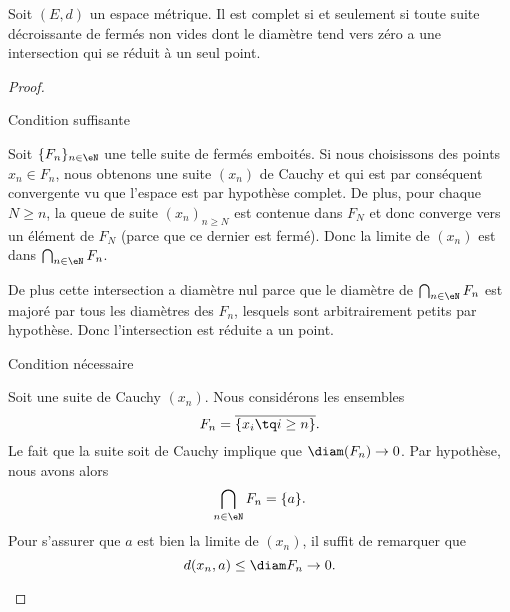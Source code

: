 \begin{theorem}   \label{ThoCQAcZxX}
    Soit \( (E,d)\) un espace métrique. Il est complet si et seulement si toute suite décroissante de fermés non vides dont le diamètre tend vers zéro a une intersection qui se réduit à un seul point.
\end{theorem}

\begin{proof}
    \begin{subproof}
    \item[Condition suffisante]

        Soit \( \{ F_n \}_{n\in \eN}\) une telle suite de fermés emboités. Si nous choisissons des points \( x_n\in F_n\), nous obtenons une suite \( (x_n)\) de Cauchy et qui est par conséquent convergente vu que l'espace est par hypothèse complet. De plus, pour chaque \( N\geq n\), la queue de suite \( (x_n)_{n\geq N}\) est contenue dans \( F_N\) et donc converge vers un élément de \( F_N\) (parce que ce dernier est fermé). Donc la limite de \( (x_n)\) est dans \( \bigcap_{n\in \eN}F_n\).

        De plus cette intersection a diamètre nul parce que le diamètre de \( \bigcap_{n\in \eN}F_n\) est majoré par tous les diamètres des \( F_n\), lesquels sont arbitrairement petits par hypothèse. Donc l'intersection est réduite a un point.

    \item[Condition nécessaire]

        Soit une suite de Cauchy \( (x_n)\). Nous considérons les ensembles
        \begin{equation}
            F_n=\overline{ \{ x_i\tq i\geq n \} }.
        \end{equation}
        Le fait que la suite soit de Cauchy implique que \( \diam(F_n)\to 0\). Par hypothèse, nous avons alors
        \begin{equation}
            \bigcap_{n\in \eN}F_n=\{ a \}.
        \end{equation}
        Pour s'assurer que \( a\) est bien la limite de \( (x_n)\), il suffit de remarquer que
        \begin{equation}
            d(x_n,a)\leq \diam F_n\to 0.
        \end{equation}
    \end{subproof}
\end{proof}

